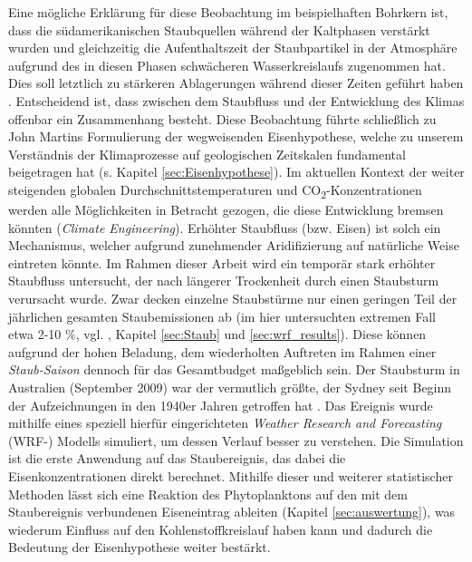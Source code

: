 \documentclass[12pt,a4paper,onecolumn]{scrartcl}
\newcommand{\cotwo}{CO\textsubscript{2}}
\begin{document}
Eine mögliche Erklärung für diese Beobachtung im beispielhaften Bohrkern ist, dass die südamerikanischen Staubquellen während der Kaltphasen verstärkt wurden und gleichzeitig die Aufenthaltszeit der Staubpartikel in der Atmosphäre aufgrund des in diesen Phasen schwächeren Wasserkreislaufs zugenommen hat. Dies soll letztlich zu stärkeren Ablagerungen während dieser Zeiten geführt haben \citep{Lambert.2008}. Entscheidend ist, dass zwischen dem Staubfluss und der Entwicklung des Klimas offenbar ein Zusammenhang besteht. Diese Beobachtung führte schließlich zu John Martins Formulierung der wegweisenden Eisenhypothese, welche zu unserem Verständnis der Klimaprozesse auf geologischen Zeitskalen fundamental beigetragen hat (s. Kapitel \ref{sec:Eisenhypothese}). Im aktuellen Kontext der weiter steigenden globalen Durchschnittstemperaturen und \cotwo -Konzentrationen werden alle Möglichkeiten in Betracht gezogen, die diese Entwicklung bremsen könnten (\textit{Climate Engineering}). Erhöhter Staubfluss (bzw. Eisen) ist solch ein Mechanismus, welcher aufgrund zunehmender Aridifizierung \citep{IPCCpol.2018} auf natürliche Weise eintreten könnte. Im Rahmen dieser Arbeit wird ein temporär stark erhöhter Staubfluss untersucht, der nach längerer Trockenheit durch einen Staubsturm verursacht wurde. Zwar decken einzelne Staubstürme nur einen geringen Teil der jährlichen gesamten Staubemissionen ab (im hier untersuchten extremen Fall etwa 2-10 \%, vgl. \cite{Shao.2011}, Kapitel \ref{sec:Staub} und \ref{sec:wrf_results}). Diese können aufgrund der hohen Beladung, dem wiederholten Auftreten im Rahmen einer \textit{Staub-Saison} dennoch für das Gesamtbudget maßgeblich sein. Der Staubsturm in Australien (September 2009) war der vermutlich größte, der Sydney seit Beginn der Aufzeichnungen in den 1940er Jahren getroffen hat \citep{Leys.2011}. Das Ereignis wurde mithilfe eines speziell hierfür eingerichteten \textit{Weather Research and Forecasting} (WRF-) Modells simuliert, um dessen Verlauf besser zu verstehen. Die Simulation ist die erste Anwendung auf das Staubereignis, das dabei die Eisenkonzentrationen direkt berechnet. Mithilfe dieser und weiterer statistischer Methoden lässt sich eine Reaktion des Phytoplanktons auf den mit dem Staubereignis verbundenen Eiseneintrag ableiten (Kapitel \ref{sec:auswertung}), was wiederum Einfluss auf den Kohlenstoffkreislauf haben kann und dadurch die Bedeutung der Eisenhypothese weiter bestärkt. \linebreak
\end{document}
